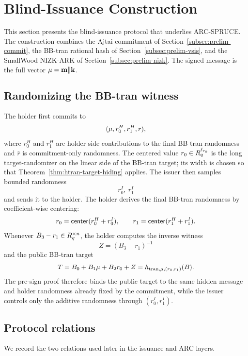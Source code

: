 \section{Blind-Issuance Construction}
\label{sec:blind-signature}

This section presents the blind-issuance protocol that underlies ARC-SPRUCE.  The construction combines the
Ajtai commitment of Section~\ref{subsec:prelim-commit}, the BB-tran rational hash of
Section~\ref{subsec:prelim-vsis}, and the SmallWood NIZK-ARK of Section~\ref{subsec:prelim-nizk}.  The
signed message is the full vector $\mathbf{\mu}=\mathbf{m}\Vert\mathbf{k}$.

\subsection{Randomizing the BB-tran witness}
The holder first commits to
\[
  (\mathbf{\mu},r_0^H,r_1^H,\bar r),
\]
where $r_0^H$ and $r_1^H$ are holder-side contributions to the final BB-tran randomness and $\bar r$ is
commitment-only randomness.  The centered value $r_0\in R_q^{\ell_{r_0}}$ is the long target-randomizer on the
linear side of the BB-tran target; its width is chosen so that Theorem~\ref{thm:htran-target-hiding} applies.
The issuer then samples bounded randomness
\[
  r_0^I,\ r_1^I
\]
and sends it to the holder.  The holder derives the final BB-tran randomness by coefficient-wise centering:
\begin{equation}
  r_0=\mathsf{center}(r_0^H+r_0^I),
  \qquad
  r_1=\mathsf{center}(r_1^H+r_1^I).
  \label{eq:bs-centered-randomness}
\end{equation}
Whenever $B_3-r_1\in R_q^{\times n}$, the holder computes the inverse witness
\[
  Z=(B_3-r_1)^{-1}
\]
and the public BB-tran target
\begin{equation}
  T=B_0+B_1\mathbf{\mu}+B_2r_0+Z
  =h_{\mathrm{tran},\mathbf{\mu},(r_0,r_1)}(B).
  \label{eq:bs-public-target}
\end{equation}
The pre-sign proof therefore binds the public target to the same hidden message and holder randomness already
fixed by the commitment, while the issuer controls only the additive randomness through
$(r_0^I,r_1^I)$.

\subsection{Protocol relations}
We record the two relations used later in the issuance and ARC layers.

